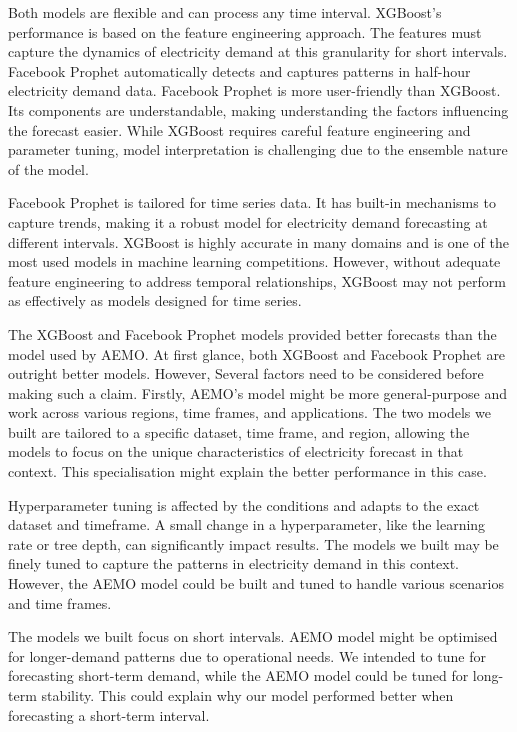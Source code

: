 \documentclass[mstat,12pt]{unswthesis}
\begin{document}
Both models are flexible and can process any time interval. XGBoost's
performance is based on the feature engineering approach. The features
must capture the dynamics of electricity demand at this granularity for
short intervals. Facebook Prophet automatically detects and captures
patterns in half-hour electricity demand data. Facebook Prophet is more
user-friendly than XGBoost. Its components are understandable, making
understanding the factors influencing the forecast easier. While XGBoost
requires careful feature engineering and parameter tuning, model
interpretation is challenging due to the ensemble nature of the model.

Facebook Prophet is tailored for time series data. It has built-in
mechanisms to capture trends, making it a robust model for electricity
demand forecasting at different intervals. XGBoost is highly accurate in
many domains and is one of the most used models in machine learning
competitions. However, without adequate feature engineering to address
temporal relationships, XGBoost may not perform as effectively as models
designed for time series.

The XGBoost and Facebook Prophet models provided better forecasts than
the model used by AEMO. At first glance, both XGBoost and Facebook
Prophet are outright better models. However, Several factors need to be
considered before making such a claim. Firstly, AEMO's model might be
more general-purpose and work across various regions, time frames, and
applications. The two models we built are tailored to a specific
dataset, time frame, and region, allowing the models to focus on the
unique characteristics of electricity forecast in that context. This
specialisation might explain the better performance in this case.

Hyperparameter tuning is affected by the conditions and adapts to the
exact dataset and timeframe. A small change in a hyperparameter, like
the learning rate or tree depth, can significantly impact results. The
models we built may be finely tuned to capture the patterns in
electricity demand in this context. However, the AEMO model could be
built and tuned to handle various scenarios and time frames.

The models we built focus on short intervals. AEMO model might be
optimised for longer-demand patterns due to operational needs. We
intended to tune for forecasting short-term demand, while the AEMO model
could be tuned for long-term stability. This could explain why our model
performed better when forecasting a short-term interval.
\end{document}
